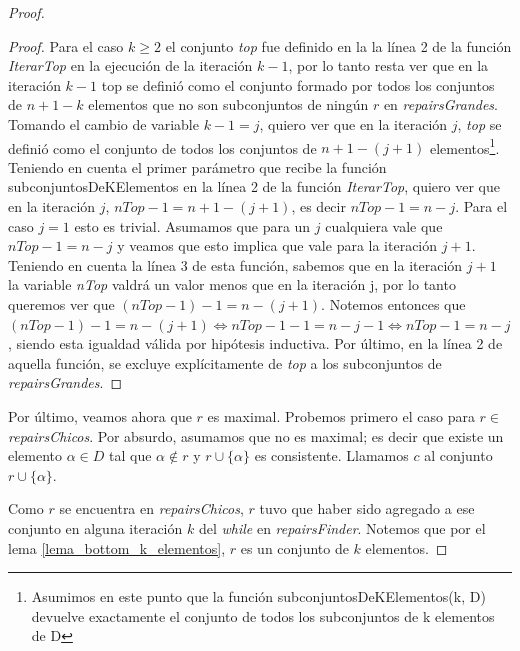 \documentclass[11pt,a4paper,twoside]{tesis}
\begin{document}
\begin{proof}
\begin{proof}
Para el caso $k \geq 2$ el conjunto \textit{top} fue definido en la la línea 2 de la función \textit{IterarTop} en la ejecución de la iteración $k-1$, por lo tanto resta ver que en la iteración $k-1$ top se definió como el conjunto formado por todos los conjuntos de $n + 1 - k$ elementos que no son subconjuntos de ningún $r$ en \textit{repairsGrandes}. Tomando el cambio de variable $k - 1 = j$, quiero ver que en la iteración $j$, \textit{top} se definió como el conjunto de  todos los conjuntos de $n + 1 - (j + 1)$ elementos\footnote{Asumimos en este punto que la función subconjuntosDeKElementos(k, D) devuelve exactamente el conjunto de todos los subconjuntos de k elementos de D}. Teniendo en cuenta el primer parámetro que recibe la función subconjuntosDeKElementos en la línea 2 de la función \textit{IterarTop}, quiero ver que en la iteración $j$, $nTop-1=n + 1 - (j + 1)$, es decir $nTop-1=n-j$. Para el caso $j=1$ esto es trivial. Asumamos que para un $j$ cualquiera vale que $nTop-1=n-j$ y veamos que esto implica que vale para la iteración $j+1$. Teniendo en cuenta la línea 3 de esta función, sabemos que en la iteración $j+1$ la variable \textit{nTop} valdrá un valor menos que en la iteración j, por lo tanto queremos ver que $(nTop-1) - 1 = n - (j+1)$. Notemos entonces que $(nTop-1) - 1 = n - (j+1) \iff nTop-1 - 1 = n - j -1 \iff nTop-1 = n - j$, siendo esta igualdad válida por hipótesis inductiva.
Por último, en la línea 2 de aquella función, se excluye explícitamente de \textit{top} a los subconjuntos de \textit{repairsGrandes}.
\end{proof}









Por último, veamos ahora que $r$ es maximal. Probemos primero el caso para $r \in$  \textit{repairsChicos}. Por absurdo, asumamos que no es maximal; es decir que existe un elemento $\alpha \in D$ tal que $\alpha \not\in r$ y $r \cup \{\alpha\}$ es consistente. Llamamos $c$ al conjunto $r \cup \{\alpha\}$. 

Como $r$ se encuentra en \textit{repairsChicos}, $r$ tuvo que haber sido agregado a ese conjunto en alguna iteración $k$ del \textit{while} en \textit{repairsFinder}. Notemos que por el lema \ref{lema_bottom_k_elementos}, $r$ es un conjunto de $k$ elementos. 



\end{proof}
\end{document}
